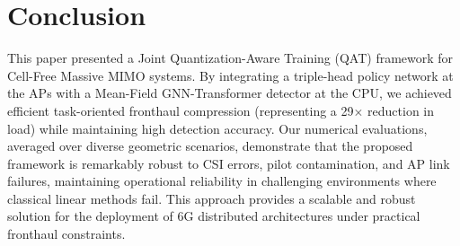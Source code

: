 \section{Conclusion}
This paper presented a Joint Quantization-Aware Training (QAT) framework for Cell-Free Massive MIMO systems. By integrating a triple-head policy network at the APs with a Mean-Field GNN-Transformer detector at the CPU, we achieved efficient task-oriented fronthaul compression (representing a 29$\times$ reduction in load) while maintaining high detection accuracy. Our numerical evaluations, averaged over diverse geometric scenarios, demonstrate that the proposed framework is remarkably robust to CSI errors, pilot contamination, and AP link failures, maintaining operational reliability in challenging environments where classical linear methods fail. This approach provides a scalable and robust solution for the deployment of 6G distributed architectures under practical fronthaul constraints.